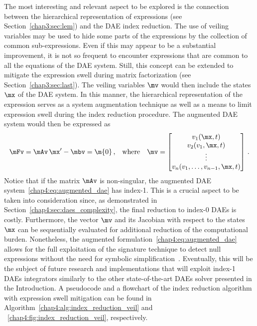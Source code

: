 The most interesting and relevant aspect to be explored is the connection between the hierarchical representation of expressions (see Section~\ref{chap3:sec:lem}) and the \ac{DAE} index reduction. The use of veiling variables may be used to hide some parts of the expressions by the collection of common sub-expressions. Even if this may appear to be a substantial improvement, it is not so frequent to encounter expressions that are common to all the equations of the \ac{DAE} system. Still, this concept can be extended to mitigate the expression swell during matrix factorization (see Section~\ref{chap3:sec:last}). The veiling variables $\mv$ would then include the states $\mx$ of the \ac{DAE} system. In this manner, the hierarchical representation of the expression serves as a system augmentation technique as well as a means to limit expression swell during the index reduction procedure. The augmented \ac{DAE} system would then be expressed as
%
\begin{equation}
  \label{chap4:eq:augmented_dae}
  \mFv = \mAv \, \mx^\prime - \mbv = \m{0} \, \text{,}
  \quad \text{where} \quad
  \mv = \begin{bmatrix}
    v_{1}(\mx, t) \\
    v_{2}(v_{1}, \mx, t) \\
    \vdots \\
    v_{n}(v_{1}, \dots, v_{n-1}, \mx, t) \\
  \end{bmatrix} \, \text{.}
\end{equation}
%
Notice that if the matrix $\mAv$ is non-singular, the augmented \ac{DAE} system~\eqref{chap4:eq:augmented_dae} has index-1. This is a crucial aspect to be taken into consideration since, as demonstrated in Section~\ref{chap4:sec:daes_complexity}, the final reduction to index-0 \acp{DAE} is costly. Furthermore, the vector $\mv$ and its Jacobian with respect to the states $\mx$ can be sequentially evaluated for additional reduction of the computational burden. Nonetheless, the augmented formulation~\eqref{chap4:eq:augmented_dae} allows for the full exploitation of the signature technique to detect null expressions without the need for symbolic simplification~\cite{monagan1994signature}. Eventually, this will be the subject of future research and implementations that will exploit index-1 \acp{DAE} integrators similarly to the other state-of-the-art \acp{DAE} solver presented in the Introduction. A pseudocode and a flowchart of the index reduction algorithm with expression swell mitigation can be found in Algorithm~\ref{chap4:alg:index_reduction_veil} and \figurename~\ref{chap4:fig:index_reduction_veil}, respectively.

